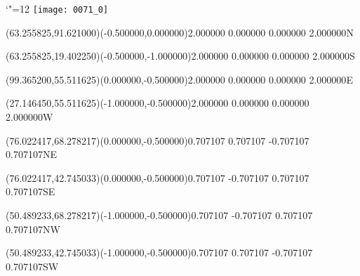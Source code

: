 \documentclass[12pt]{article}
\begin{document}
\makeatletter%
\let\ASYencoding\f@encoding%
\let\ASYfamily\f@family%
\let\ASYseries\f@series%
\let\ASYshape\f@shape%
\makeatother%
{\catcode`"=12%
\texttt{[image: 0071\_0]}%
}%
\kern -118.356190pt%
%
%
\fontsize{12.000000}{14.400000}\selectfont%
\usefont{\ASYencoding}{\ASYfamily}{\ASYseries}{\ASYshape}%
\ASYalignT(63.255825,91.621000)(-0.500000,0.000000){2.000000 0.000000 0.000000 2.000000}{N}%
%
%
\fontsize{12.000000}{14.400000}\selectfont%
\ASYalignT(63.255825,19.402250)(-0.500000,-1.000000){2.000000 0.000000 0.000000 2.000000}{S}%
%
%
\fontsize{12.000000}{14.400000}\selectfont%
\ASYalignT(99.365200,55.511625)(0.000000,-0.500000){2.000000 0.000000 0.000000 2.000000}{E}%
%
%
\fontsize{12.000000}{14.400000}\selectfont%
\ASYalignT(27.146450,55.511625)(-1.000000,-0.500000){2.000000 0.000000 0.000000 2.000000}{W}%
%
%
\fontsize{12.000000}{14.400000}\selectfont%
\ASYalignT(76.022417,68.278217)(0.000000,-0.500000){0.707107 0.707107 -0.707107 0.707107}{NE}%
%
%
\fontsize{12.000000}{14.400000}\selectfont%
\ASYalignT(76.022417,42.745033)(0.000000,-0.500000){0.707107 -0.707107 0.707107 0.707107}{SE}%
%
%
\fontsize{12.000000}{14.400000}\selectfont%
\ASYalignT(50.489233,68.278217)(-1.000000,-0.500000){0.707107 -0.707107 0.707107 0.707107}{NW}%
%
%
\fontsize{12.000000}{14.400000}\selectfont%
\ASYalignT(50.489233,42.745033)(-1.000000,-0.500000){0.707107 0.707107 -0.707107 0.707107}{SW}%
\end{document}
